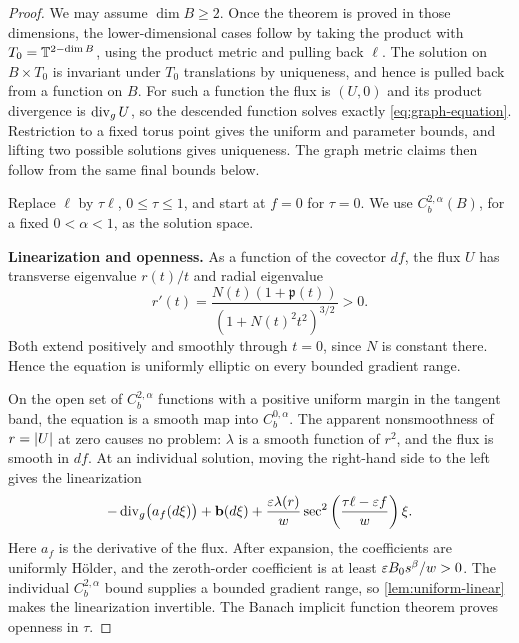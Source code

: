 \begin{proof}
We may assume $\dim B\ge2$. Once the theorem is proved in those dimensions,
the lower-dimensional cases follow by taking the product with
$T_0=\mathbb T^{2-\dim B}$, using the product metric and pulling back $\ell$.
The solution on $B\times T_0$ is invariant under $T_0$ translations by
uniqueness, and hence is pulled back from a function on $B$. For such a
function the flux is $(U,0)$ and its product divergence is $\operatorname{div}_g U$,
so the descended function solves exactly \eqref{eq:graph-equation}.
Restriction to a fixed torus point gives the uniform and parameter bounds,
and lifting two possible solutions gives uniqueness. The graph metric
claims then follow from the same final bounds below.

Replace $\ell$ by $\tau\ell$, $0\le\tau\le1$, and start at $f=0$ for $\tau=0$. We use $C_b^{2,\alpha}(B)$, for a fixed $0<\alpha<1$, as the solution space.

\smallskip\noindent\textbf{Linearization and openness.}
As a function of the covector $df$, the flux $U$ has transverse eigenvalue $r(t)/t$ and radial eigenvalue
\begin{equation}\label{eq:graph-flux-ellipticity}
 r'(t)=\frac{N(t)(1+\mathfrak p(t))}
                {(1+N(t)^2t^2)^{3/2}}>0.
\end{equation}
Both extend positively and smoothly through $t=0$, since $N$ is constant there. Hence the equation is uniformly elliptic on every bounded gradient range.

On the open set of $C_b^{2,\alpha}$ functions with a positive uniform margin in the tangent band, the equation is a smooth map into $C_b^{0,\alpha}$. The apparent nonsmoothness of $r=\lvert U\rvert$ at zero causes no problem: $\lambda$ is a smooth function of $r^2$, and the flux is smooth in $df$. At an individual solution, moving the right-hand side to the left gives the linearization
\begin{equation}\label{eq:graph-linearization}
 -\operatorname{div}_g\bigl(a_f(d\xi)\bigr)+\mathbf b(d\xi)
   +\frac{\varepsilon\lambda(r)}w
       \sec^2\left(\frac{\tau\ell-\varepsilon f}{w}\right)\xi.
\end{equation}
Here $a_f$ is the derivative of the flux. After expansion, the coefficients are uniformly H\"older, and the zeroth-order coefficient is at least
$\varepsilon B_0s^\beta/w>0$. The individual $C_b^{2,\alpha}$ bound supplies a bounded gradient range, so \cref{lem:uniform-linear} makes the linearization invertible. The Banach implicit function theorem proves openness in $\tau$.


\end{proof}
